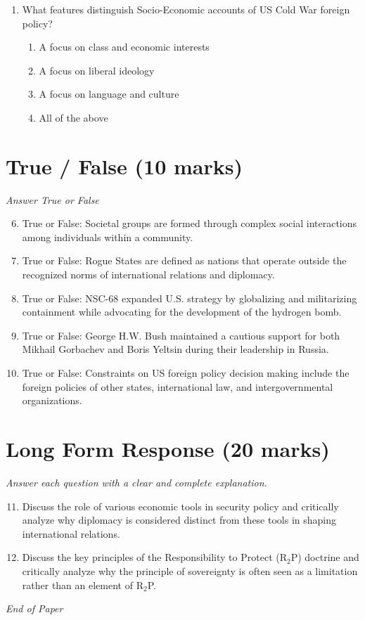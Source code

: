 \documentclass[12pt]{article}
\begin{document}
\begin{enumerate}[label=\arabic*.]
\begin{enumerate}[label=(\alph*)]
    \item Increase in US finances
    \item Increase in US military capability
    \item Increase in US international influence
\end{enumerate}
\item What features distinguish Socio-Economic accounts of US Cold War foreign policy?
\begin{enumerate}[label=(\alph*)]
    \item A focus on class and economic interests
    \item A focus on liberal ideology
    \item A focus on language and culture
    \item All of the above
\end{enumerate}
\end{enumerate}

\section*{True / False (10 marks)}
\textit{Answer True or False}
\begin{enumerate}[label=\arabic*.]
\setcounter{enumi}{5}
\item True or False: Societal groups are formed through complex social interactions among individuals within a community.
\item True or False: Rogue States are defined as nations that operate outside the recognized norms of international relations and diplomacy.
\item True or False: NSC-68 expanded U.S. strategy by globalizing and militarizing containment while advocating for the development of the hydrogen bomb.
\item True or False: George H.W. Bush maintained a cautious support for both Mikhail Gorbachev and Boris Yeltsin during their leadership in Russia.
\item True or False: Constraints on US foreign policy decision making include the foreign policies of other states, international law, and intergovernmental organizations.
\end{enumerate}

\section*{Long Form Response (20 marks)}
\textit{Answer each question with a clear and complete explanation.}
\begin{enumerate}[label=\arabic*.]
\setcounter{enumi}{10}
\item Discuss the role of various economic tools in security policy and critically analyze why diplomacy is considered distinct from these tools in shaping international relations.
\item Discuss the key principles of the Responsibility to Protect (R$_{2}$P) doctrine and critically analyze why the principle of sovereignty is often seen as a limitation rather than an element of R$_{2}$P.
\end{enumerate}

\vfill
\noindent\textit{End of Paper}
\end{document}
